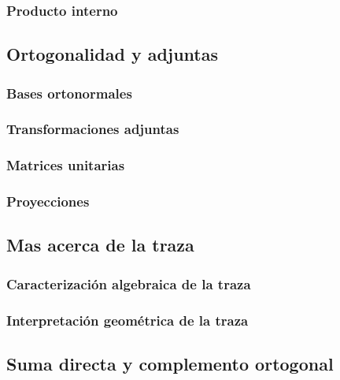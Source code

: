 \subsubsection{Producto interno} %
\label{ssub:producto_interno}

\subsection{Ortogonalidad y adjuntas} %
\label{sub:ortogonalidad_y_adjuntas}

\subsubsection{Bases ortonormales} %
\label{ssub:bases_ortonormales}

\subsubsection{Transformaciones adjuntas} %
\label{ssub:transformaciones_adjuntas}

\subsubsection{Matrices unitarias} %
\label{ssub:matrices_unitarias}

\subsubsection{Proyecciones} %
\label{ssub:proyecciones}

\subsection{Mas acerca de la traza} %
\label{sub:mas_acerca_de_la_traza}

\subsubsection{Caracterización algebraica de la traza} %
\label{ssub:caracterizacion_algebraica_de_la_traza}

\subsubsection{Interpretación geométrica de la traza} %
\label{ssub:interpretacion_geometrica_de_la_traza}

\subsection{Suma directa y complemento ortogonal} %
\label{sub:suma_directa_y_complemento_ortogonal}

